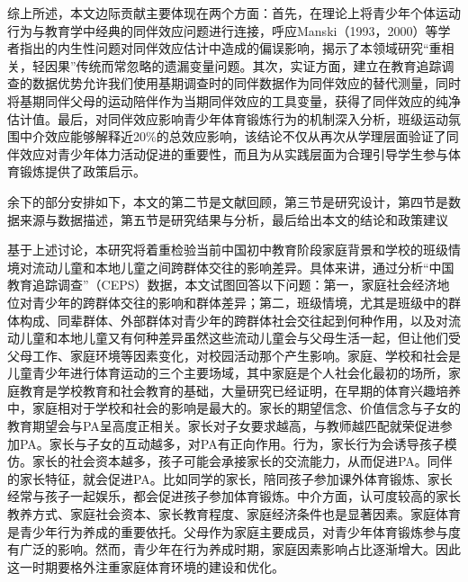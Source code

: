 综上所述，本文边际贡献主要体现在两个方面：首先，在理论上将青少年个体运动行为与教育学中经典的同伴效应问题进行连接，呼应Manski（1993，2000）等学者指出的内生性问题对同伴效应估计中造成的偏误影响，揭示了本领域研究“重相关，轻因果”传统而常忽略的遗漏变量问题。其次，实证方面，建立在教育追踪调查的数据优势允许我们使用基期调查时的同伴数据作为同伴效应的替代测量，同时将基期同伴父母的运动陪伴作为当期同伴效应的工具变量，获得了同伴效应的纯净估计值。最后，对同伴效应影响青少年体育锻炼行为的机制深入分析，班级运动氛围中介效应能够解释近20\%的总效应影响，该结论不仅从再次从学理层面验证了同伴效应对青少年体力活动促进的重要性，而且为从实践层面为合理引导学生参与体育锻炼提供了政策启示。

余下的部分安排如下，本文的第二节是文献回顾，第三节是研究设计，第四节是数据来源与数据描述，第五节是研究结果与分析，最后给出本文的结论和政策建议



基于上述讨论，本研究将着重检验当前中国初中教育阶段家庭背景和学校的班级情境对流动儿童和本地儿童之间跨群体交往的影响差异。具体来讲，通过分析“中国教育追踪调查”（CEPS）数据，本文试图回答以下问题：第一，家庭社会经济地位对青少年的跨群体交往的影响和群体差异；第二，班级情境，尤其是班级中的群体构成、同辈群体、外部群体对青少年的跨群体社会交往起到何种作用，以及对流动儿童和本地儿童又有何种差异虽然这些流动儿童会与父母生活一起，但让他们受父母工作、家庭环境等因素变化，对校园活动那个产生影响。家庭、学校和社会是儿童青少年进行体育运动的三个主要场域，其中家庭是个人社会化最初的场所，家庭教育是学校教育和社会教育的基础，大量研究已经证明，在早期的体育兴趣培养中，家庭相对于学校和社会的影响是最大的。家长的期望信念、价值信念与子女的教育期望会与PA呈高度正相关。家长对子女要求越高，与教师越匹配就荣促进参加PA。家长与子女的互动越多，对PA有正向作用。行为，家长行为会诱导孩子模仿。家长的社会资本越多，孩子可能会承接家长的交流能力，从而促进PA。同伴的家长特征，就会促进PA。比如同学的家长，陪同孩子参加课外体育锻炼、家长经常与孩子一起娱乐，都会促进孩子参加体育锻炼。中介方面，认可度较高的家长教养方式、家庭社会资本、家长教育程度、家庭经济条件也是显著因素。家庭体育是青少年行为养成的重要依托。父母作为家庭主要成员，对青少年体育锻炼参与度有广泛的影响。然而，青少年在行为养成时期，家庭因素影响占比逐渐增大。因此这一时期要格外注重家庭体育环境的建设和优化。
